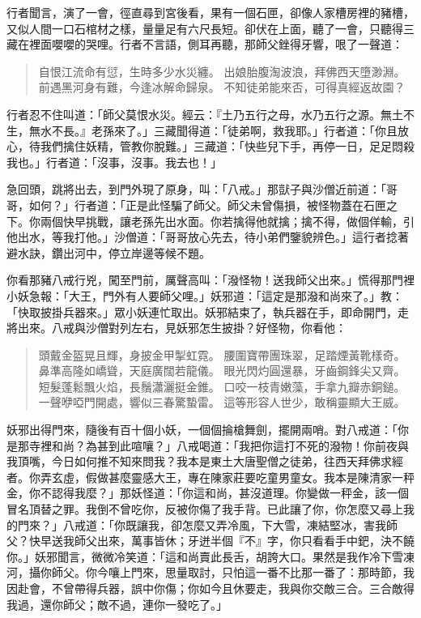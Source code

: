 行者聞言，演了一會，徑直尋到宮後看，果有一個石匣，卻像人家槽房裡的豬槽，又似人間一口石棺材之樣，量量足有六尺長短。卻伏在上面，聽了一會，只聽得三藏在裡面嚶嚶的哭哩。行者不言語，側耳再聽，那師父銼得牙響，哏了一聲道：
\begin{quote}
自恨江流命有愆，生時多少水災纏。
出娘胎腹淘波浪，拜佛西天墮渺淵。
前遇黑河身有難，今逢冰解命歸泉。
不知徒弟能來否，可得真經返故園？
\end{quote}

行者忍不住叫道：「師父莫恨水災。經云：『土乃五行之母，水乃五行之源。無土不生，無水不長。』老孫來了。」三藏聞得道：「徒弟啊，救我耶。」行者道：「你且放心，待我們擒住妖精，管教你脫難。」三藏道：「快些兒下手，再停一日，足足悶殺我也。」行者道：「沒事，沒事。我去也！」

急回頭，跳將出去，到門外現了原身，叫：「八戒。」那獃子與沙僧近前道：「哥哥，如何？」行者道：「正是此怪騙了師父。師父未曾傷損，被怪物蓋在石匣之下。你兩個快早挑戰，讓老孫先出水面。你若擒得他就擒；擒不得，做個佯輸，引他出水，等我打他。」沙僧道：「哥哥放心先去，待小弟們鑒貌辨色。」這行者捻著避水訣，鑽出河中，停立岸邊等候不題。

你看那豬八戒行兇，闖至門前，厲聲高叫：「潑怪物！送我師父出來。」慌得那門裡小妖急報：「大王，門外有人要師父哩。」妖邪道：「這定是那潑和尚來了。」教：「快取披掛兵器來。」眾小妖連忙取出。妖邪結束了，執兵器在手，即命開門，走將出來。八戒與沙僧對列左右，見妖邪怎生披掛？好怪物，你看他：
\begin{quote}
頭戴金盔晃且輝，身披金甲掣虹霓。
腰圍寶帶團珠翠，足踏煙黃靴樣奇。
鼻準高隆如嶠聳，天庭廣闊若龍儀。
眼光閃灼圓還暴，牙齒鋼鋒尖又齊。
短髮蓬鬆飄火焰，長鬚瀟灑挺金錐。
口咬一枝青嫩藻，手拿九瓣赤銅鎚。
一聲咿啞門開處，響似三春驚蟄雷。
這等形容人世少，敢稱靈顯大王威。
\end{quote}

妖邪出得門來，隨後有百十個小妖，一個個掄槍舞劍，擺開兩哨。對八戒道：「你是那寺裡和尚？為甚到此喧嚷？」八戒喝道：「我把你這打不死的潑物！你前夜與我頂嘴，今日如何推不知來問我？我本是東土大唐聖僧之徒弟，往西天拜佛求經者。你弄玄虛，假做甚麼靈感大王，專在陳家莊要吃童男童女。我本是陳清家一秤金，你不認得我麼？」那妖怪道：「你這和尚，甚沒道理。你變做一秤金，該一個冒名頂替之罪。我倒不曾吃你，反被你傷了我手背。已此讓了你，你怎麼又尋上我的門來？」八戒道：「你既讓我，卻怎麼又弄冷風，下大雪，凍結堅冰，害我師父？快早送我師父出來，萬事皆休；牙迸半個『不』字，你只看看手中鈀，決不饒你。」妖邪聞言，微微冷笑道：「這和尚賣此長舌，胡誇大口。果然是我作冷下雪凍河，攝你師父。你今嚷上門來，思量取討，只怕這一番不比那一番了：那時節，我因赴會，不曾帶得兵器，誤中你傷；你如今且休要走，我與你交敵三合。三合敵得我過，還你師父；敵不過，連你一發吃了。」

